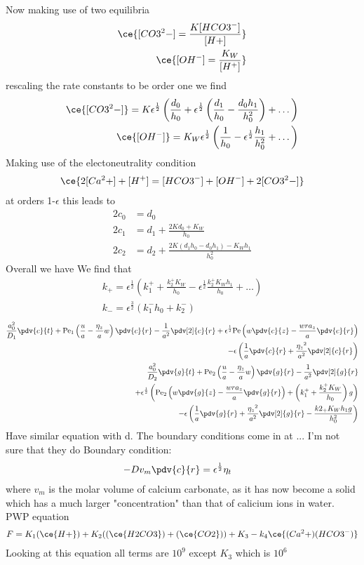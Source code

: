 \documentclass[12pt]{article}
\newcommand{\rt}{^{\frac{1}{2}}}
\newcommand{\rtt}{^{\frac{3}{2}}}
\newcommand{\Pe}{\mathrm{Pe}}
\begin{document}
Now making use of two equilibria 
\begin{align}
\ce{[CO3^2-]=\frac{K[HCO3^-]}{[H+]}}\\
\ce{[OH^-]=\frac{K_W}{[H^+]}}
\end{align}
rescaling the rate constants to be order one we find
\begin{align}
\ce{[CO3^2-]}=K\epsilon\rt\left(\frac{d_0}{h_0}+\epsilon\rt\left(\frac{d_1}{h_0}-\frac{d_0h_1}{h_0^2}\right)+\dots\right)\\
\ce{[OH^-]}=K_W\epsilon\rt\left(\frac{1}{h_0}-\epsilon\rt\frac{h_1}{h_0^2}+\dots\right)\\
\end{align}
Making use of the electoneutrality condition
\begin{align}
\ce{2[Ca^2+] + [H^+]=[HCO3^-] + [OH^-] + 2[CO3^2-]}
\end{align}
at orders 1-$\epsilon$ this leads to 
\begin{align}
2c_0 &= d_0\\
2c_1 & = d_1+\frac{2Kd_0+K_W}{h_0}\\
2c_2& = d_2+\frac{2K(d_1h_0-d_0h_1)-K_Wh_1}{h_0^2}
\end{align}
Overall we have 
We find that
\begin{align}
k_+ = \epsilon\rt\left(k_1^+ + \frac{k_2^+K_W}{h_0}-\epsilon\rt \frac{k_2^+K_Wh_1}{h_0}+\dots\right)\\
k_- = \epsilon\rtt\left(k_1^-h_0+k_2^-\right)
\end{align}
\begin{align}
\frac{a_0^2}{D_1}\pdv{c}{t}+\Pe_1\left(\frac{u}{a}-\frac{\eta_z}{a}w\right)\pdv{c}{r}-\frac{1}{a^2}\pdv[2]{c}{r}+\epsilon\rt\Pe\left(w\pdv{c}{z}-\frac{wra_z}{a}\pdv{c}{r}\right)\\-\epsilon\left(\frac{1}{a}\pdv{c}{r}+\frac{{\eta_z}^2}{a^2}\pdv[2]{c}{r}\right)\\
\frac{a_0^2}{D_2}\pdv{g}{t}+\Pe_2\left(\frac{u}{a}-\frac{\eta_z}{a}w\right)\pdv{g}{r}-\frac{1}{a^2}\pdv[2]{g}{r}\\
+\epsilon\rt\left(\Pe_2\left(w\pdv{g}{z}-\frac{wra_z}{a}\pdv{g}{r}\right)+\left(k_1^++\frac{k_2^+K_W}{h_0}\right)g\right)\\
-\epsilon\left(\frac{1}{a}\pdv{g}{r}+\frac{{\eta_z}^2}{a^2}\pdv[2]{g}{r}-\frac{k2_+K_Wh_1g}{h_0^2}\right)
\end{align}
Have similar equation with d.
The boundary conditions come in at ... I'm not sure that they do 
Boundary condition:
\begin{align}
-Dv_m\pdv{c}{r} &= \epsilon\rt \eta_t
\end{align}
where $v_m$ is the molar volume of calcium carbonate, as it has now become a solid which has a much larger "concentration" than that of calicium ions in water.
PWP equation
\begin{align}
F = K_1(\ce{H+})+K_2((\ce{H2CO3})+(\ce{CO2}))+K_3-k_4\ce{(Ca^2+)(HCO3^-)}
\end{align}
Looking at this equation all terms are $10^9$ except $K_3$ which is $10^6$
\end{document}
